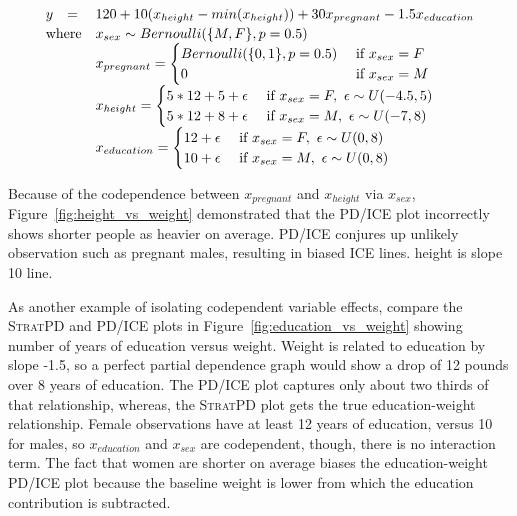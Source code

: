 \documentclass[12pt]{article}
\newcommand{\figref}[1]{Figure~\ref{#1}}
\newcommand{\spd}{\fontfamily{cmr}\textsc{\small StratPD}}
\begin{document}
\begin{equation}\label{eq:weight}
\begin{array}{rll}
y & = &120 + 10(x_{height} - min(x_{height})) + 30x_{pregnant} - 1.5x_{education}\\
\vspace{-10pt}\\
\multicolumn{2}{r}{\text{where}} & x_{sex} \sim Bernoulli(\{M,F\}, p=0.5)\\
                    & & x_{pregnant} = \begin{cases}
                                               Bernoulli(\{0,1\},p=0.5) & \text{ if } x_{sex} = F\\
                                               0 & \text{ if } x_{sex}=M\\
                                               \end{cases}\\
                    & & x_{height} = \begin{cases}
                                               5*12+5+ \epsilon & \text{ if } x_{sex}=F,~ \epsilon \sim U(-4.5,5)\\	
                                               5*12+8 + \epsilon & \text{ if } x_{sex}=M,~ \epsilon \sim U(-7,8)\\
                                               \end{cases}\\
                    & & x_{education} = \begin{cases}
                                               12 + \epsilon & \text{ if } x_{sex}=F,~ \epsilon \sim U(0,8)\\	
                                               10 + \epsilon & \text{ if } x_{sex}=M,~ \epsilon \sim U(0,8)\\
                                               \end{cases}
\end{array}
\end{equation}

Because of the codependence between $x_{pregnant}$ and $x_{height}$ via $x_{sex}$, \figref{fig:height_vs_weight} demonstrated that the PD/ICE plot incorrectly shows shorter people as heavier on average. PD/ICE conjures up unlikely observation such as pregnant males, resulting in biased ICE lines. height is slope 10 line.

As another example of isolating codependent variable effects, compare the \spd{} and PD/ICE plots in \figref{fig:education_vs_weight} showing number of years of education versus weight. Weight is related to education by slope -1.5, so a perfect partial dependence graph would show a drop of 12 pounds over 8 years of education. The PD/ICE plot captures only about two thirds of that relationship, whereas, the \spd{} plot gets the true education-weight relationship.  Female observations have at least 12 years of education, versus 10 for males, so $x_{education}$ and $x_{sex}$ are codependent, though, there is no interaction term. The fact that women are shorter on average biases the education-weight PD/ICE plot because the baseline weight is lower from which the education contribution is  subtracted.
\end{document}
